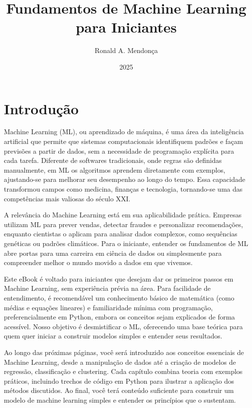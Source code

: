 \documentclass[a4paper,12pt,openany]{book}
\title{Fundamentos de Machine Learning para Iniciantes}
\author{Ronald A. Mendonça}
\date{2025}
\begin{document}
\maketitle{}
\tableofcontents{}

\newpage

\section{Introdução}
Machine Learning (ML), ou aprendizado de máquina, é uma área da inteligência artificial que permite que sistemas computacionais 
identifiquem padrões e façam previsões a partir de dados, sem a necessidade de programação explícita para cada tarefa. Diferente de 
softwares tradicionais, onde regras são definidas manualmente, em ML os algoritmos aprendem diretamente com exemplos, ajustando-se 
para melhorar seu desempenho ao longo do tempo. Essa capacidade transformou campos como medicina, finanças e tecnologia, tornando-se 
uma das competências mais valiosas do século XXI.

A relevância do Machine Learning está em sua aplicabilidade prática. Empresas utilizam ML para prever vendas, detectar fraudes e 
personalizar recomendações, enquanto cientistas o aplicam para analisar dados complexos, como sequências genéticas ou padrões climáticos. 
Para o iniciante, entender os fundamentos de ML abre portas para uma carreira em ciência de dados ou simplesmente para compreender melhor
o mundo movido a dados em que vivemos.

Este eBook é voltado para iniciantes que desejam dar os primeiros passos em Machine Learning, sem experiência prévia na área. Para facilidade de 
entendimento, é recomendável um conhecimento básico de matemática (como médias e equações lineares) e familiaridade mínima com programação, 
preferencialmente em Python, embora os conceitos sejam explicados de forma acessível. Nosso objetivo é desmistificar o ML, oferecendo 
uma base teórica para quem quer iniciar a construir modelos simples e entender seus resultados.

Ao longo das próximas páginas, você será introduzido aos conceitos essenciais de Machine Learning, desde a manipulação de dados até a criação 
de modelos de regressão, classificação e clustering. Cada capítulo combina teoria com exemplos práticos, incluindo trechos de código em 
Python para ilustrar a aplicação dos métodos discutidos. Ao final, você terá conteúdo suficiente para construir um modelo de machine learning 
simples e entender os princípios que o sustentam.
\end{document}
